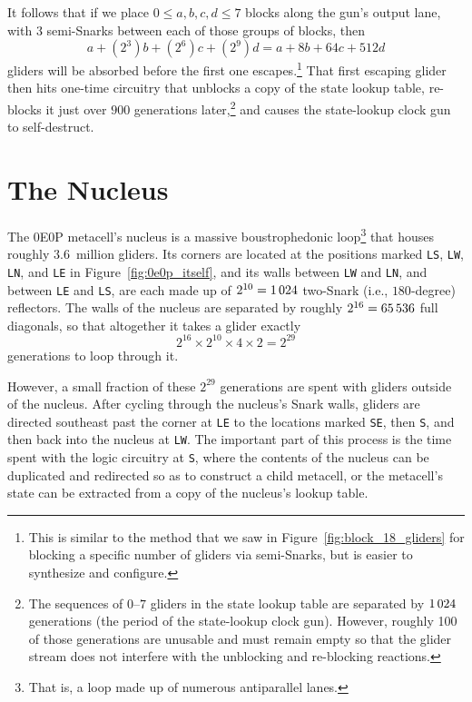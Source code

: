 It follows that if we place $0 \leq a,b,c,d \leq 7$ blocks along the gun's output lane, with $3$ semi-Snarks between each of those groups of blocks, then
\[
	a + (2^3)b + (2^6)c + (2^9)d = a + 8b + 64c + 512d
\]
gliders will be absorbed before the first one escapes.\footnote{This is similar to the method that we saw in Figure~\ref{fig:block_18_gliders} for blocking a specific number of gliders via semi-Snarks, but is easier to synthesize and configure.} That first escaping glider then hits one-time circuitry that unblocks a copy of the state lookup table, re-blocks it just over $900$ generations later,\footnote{The sequences of $0$--$7$ gliders in the state lookup table are separated by $1{\,}024$ generations (the period of the state-lookup clock gun). However, roughly 100 of those generations are unusable and must remain empty so that the glider stream does not interfere with the unblocking and re-blocking reactions.} and causes the state-lookup clock gun to self-destruct.


\section{The Nucleus}\label{sec:0e0p_structure_nucleus}

The 0E0P metacell's nucleus is a massive boustrophedonic loop\footnote{That is, a loop made up of numerous antiparallel lanes.} that houses roughly $3.6$~million gliders. Its corners are located at the positions marked \texttt{LS}, \texttt{LW}, \texttt{LN}, and \texttt{LE} in Figure~\ref{fig:0e0p_itself}, and its walls between \texttt{LW} and \texttt{LN}, and between \texttt{LE} and \texttt{LS}, are each made up of $2^{10} = 1{\,}024$ two-Snark (i.e., $180$-degree) reflectors. The walls of the nucleus are separated by roughly $2^{16} = 65{\,}536$ full diagonals, so that altogether it takes a glider exactly
\[
	2^{16} \times 2^{10} \times 4 \times 2 = 2^{29}
\]
generations to loop through it.

However, a small fraction of these $2^{29}$ generations are spent with gliders outside of the nucleus. After cycling through the nucleus's Snark walls, gliders are directed southeast past the corner at \texttt{LE} to the locations marked \texttt{SE}, then \texttt{S}, and then back into the nucleus at \texttt{LW}. The important part of this process is the time spent with the logic circuitry at \texttt{S}, where the contents of the nucleus can be duplicated and redirected so as to construct a child metacell, or the metacell's state can be extracted from a copy of the nucleus's lookup table.

